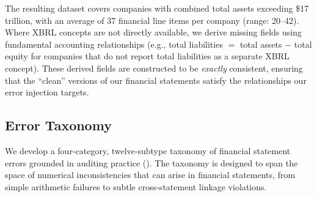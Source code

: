 \documentclass[11pt]{article}
\begin{document}
The resulting dataset covers companies with combined total assets exceeding \$17 trillion, with an average of 37 financial line items per company (range: 20--42).
Where XBRL concepts are not directly available, we derive missing fields using fundamental accounting relationships (e.g., total liabilities $=$ total assets $-$ total equity for companies that do not report total liabilities as a separate XBRL concept).
These derived fields are constructed to be \emph{exactly} consistent, ensuring that the ``clean'' versions of our financial statements satisfy the relationships our error injection targets.

\subsection{Error Taxonomy}
\label{sec:taxonomy}

We develop a four-category, twelve-subtype taxonomy of financial statement errors grounded in auditing practice ().
The taxonomy is designed to span the space of numerical inconsistencies that can arise in financial statements, from simple arithmetic failures to subtle cross-statement linkage violations.
\end{document}
